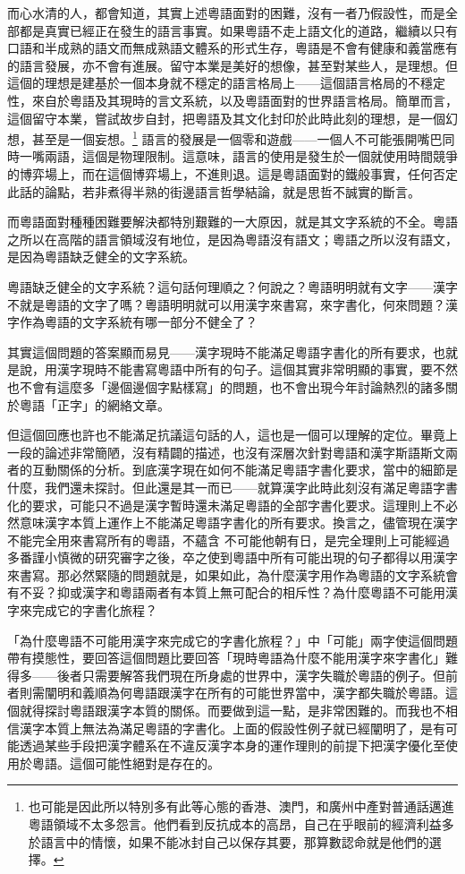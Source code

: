 \documentclass[a5paper, 10pt, openany]{book} %
\begin{document}
而心水清的人，都會知道，其實上述粵語面對的困難，沒有一者乃假設性，而是全部都是真實已經正在發生的語言事實。如果粵語不走上語文化的道路，繼續以只有口語和半成熟的語文而無成熟語文體系的形式生存，粵語是不會有健康和義當應有的語言發展，亦不會有進展。留守本業是美好的想像，甚至對某些人，是理想。但這個的理想是建基於一個本身就不穩定的語言格局上——這個語言格局的不穩定性，來自於粵語及其現時的言文系統，以及粵語面對的世界語言格局。簡單而言，這個留守本業，嘗試故步自封，把粵語及其文化封印於此時此刻的理想，是一個幻想，甚至是一個妄想。\footnote{也可能是因此所以特別多有此等心態的香港、澳門，和廣州中產對普通話邁進粵語領域不太多怨言。他們看到反抗成本的高昂，自己在乎眼前的經濟利益多於語言中的情懷，如果不能冰封自己以保存其要，那算數認命就是他們的選擇。} 語言的發展是一個零和遊戲——一個人不可能張開嘴巴同時一嘴兩語，這個是物理限制。這意味，語言的使用是發生於一個就使用時間競爭的博弈場上，而在這個博弈場上，不進則退。這是粵語面對的鐵般事實，任何否定此話的論點，若非煮得半熟的街邊語言哲學結論，就是思哲不誠實的斷言。

而粵語面對種種困難要解決都特別艱難的一大原因，就是其文字系統的不全。粵語之所以在高階的語言領域沒有地位，是因為粵語沒有語文；粵語之所以沒有語文，是因為粵語缺乏健全的文字系統。

粵語缺乏健全的文字系統？這句話何理順之？何說之？粵語明明就有文字——漢字不就是粵語的文字了嗎？粵語明明就可以用漢字來書寫，來字書化，何來問題？漢字作為粵語的文字系統有哪一部分不健全了？

其實這個問題的答案顯而易見——漢字現時不能滿足粵語字書化的所有要求，也就是說，用漢字現時不能書寫粵語中所有的句子。這個其實非常明顯的事實，要不然也不會有這麼多「邊個邊個字點樣寫」的問題，也不會出現今年討論熱烈的諸多關於粵語「正字」的網絡文章。

但這個回應也許也不能滿足抗議這句話的人，這也是一個可以理解的定位。畢竟上一段的論述非常簡陋，沒有精闢的描述，也沒有深層次針對粵語和漢字斯語斯文兩者的互動關係的分析。到底漢字現在如何不能滿足粵語字書化要求，當中的細節是什麼，我們還未探討。但此還是其一而已——就算漢字此時此刻沒有滿足粵語字書化的要求，可能只不過是漢字暫時還未滿足粵語的全部字書化要求。這理則上不必然意味漢字本質上運作上不能滿足粵語字書化的所有要求。換言之，儘管現在漢字不能完全用來書寫所有的粵語，不蘊含 不可能他朝有日，是完全理則上可能經過多番謹小慎微的研究審字之後，卒之使到粵語中所有可能出現的句子都得以用漢字來書寫。那必然緊隨的問題就是，如果如此，為什麼漢字用作為粵語的文字系統會有不妥？抑或漢字和粵語兩者有本質上無可配合的相斥性？為什麼粵語不可能用漢字來完成它的字書化旅程？

「為什麼粵語不可能用漢字來完成它的字書化旅程？」中「可能」兩字使這個問題帶有摸態性，要回答這個問題比要回答「現時粵語為什麼不能用漢字來字書化」難得多——後者只需要解答我們現在所身處的世界中，漢字失職於粵語的例子。但前者則需闡明和義順為何粵語跟漢字在所有的可能世界當中，漢字都失職於粵語。這個就得探討粵語跟漢字本質的關係。而要做到這一點，是非常困難的。而我也不相信漢字本質上無法為滿足粵語的字書化。上面的假設性例子就已經闡明了，是有可能透過某些手段把漢字體系在不違反漢字本身的運作理則的前提下把漢字優化至使用於粵語。這個可能性絕對是存在的。
\end{document}
